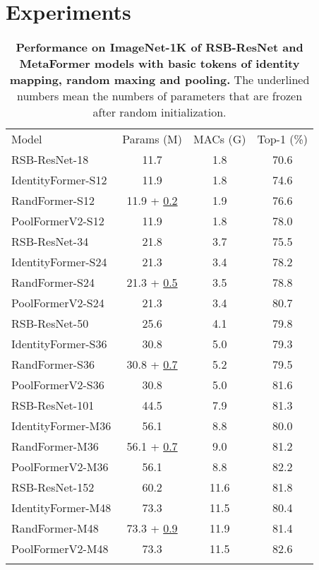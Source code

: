 \section{Experiments}
\begin{table}[t]
\renewcommand{\arraystretch}{1.3}
\caption{
\textbf{Performance on ImageNet-1K of RSB-ResNet and MetaFormer models with basic tokens of identity mapping, random maxing and pooling.} The underlined numbers mean the numbers of parameters that are frozen after random initialization.
}
\label{tab:basic_token_mixers_imagenet}
\centering
\begin{tabular}{l | c | c | c }
\whline
Model & Params (M) & MACs (G) & Top-1 (\%) \\
\whline 
RSB-ResNet-18 \cite{resnet, rsb} & 11.7 & 1.8 & 70.6 \\
IdentityFormer-S12 & 11.9 & 1.8 & 74.6 \\
RandFormer-S12 & 11.9 + \underline{0.2}  & 1.9 & 76.6 \\
PoolFormerV2-S12 \cite{metaformer} & 11.9 & 1.8 & 78.0 \\
\hline 
RSB-ResNet-34 \cite{resnet, rsb} & 21.8 & 3.7 & 75.5 \\
IdentityFormer-S24 & 21.3 & 3.4 & 78.2 \\
RandFormer-S24 & 21.3 + \underline{0.5} & 3.5 & 78.8 \\
PoolFormerV2-S24 \cite{metaformer} & 21.3 & 3.4 & 80.7 \\
\hline
RSB-ResNet-50 \cite{resnet, rsb} & 25.6 & 4.1 & 79.8 \\
IdentityFormer-S36 & 30.8 & 5.0 & 79.3 \\
RandFormer-S36 & 30.8 + \underline{0.7} & 5.2 & 79.5 \\
PoolFormerV2-S36 \cite{metaformer} & 30.8 & 5.0 & 81.6 \\
\hline
RSB-ResNet-101 \cite{resnet, rsb} & 44.5 & 7.9 & 81.3 \\
IdentityFormer-M36 & 56.1 & 8.8 & 80.0 \\
RandFormer-M36 & 56.1 + \underline{0.7} & 9.0 & 81.2 \\
PoolFormerV2-M36 \cite{metaformer} & 56.1 & 8.8 & 82.2 \\
\hline
RSB-ResNet-152 \cite{resnet, rsb} & 60.2 & 11.6 & 81.8 \\
IdentityFormer-M48 & 73.3 & 11.5 & 80.4 \\
RandFormer-M48 & 73.3 + \underline{0.9} & 11.9 & 81.4 \\
PoolFormerV2-M48 \cite{metaformer} & 73.3 & 11.5 & 82.6 \\
\whline
\end{tabular} \end{table}




